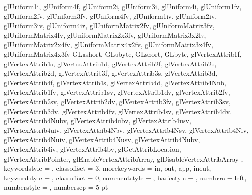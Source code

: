 {{{		glUniform1i, glUniform4f, glUniform2i, glUniform3i, glUniform4i,
		glUniform1fv, glUniform2fv, glUniform3fv, glUniform4fv,
		glUniform1iv, glUniform2iv, glUniform3iv, glUniform4iv,
		glUniformMatrix2fv, glUniformMatrix3fv, glUniformMatrix4fv, glUniformMatrix2x3fv, glUniformMatrix3x2fv, glUniformMatrix2x4fv, glUniformMatrix4x2fv, glUniformMatrix3x4fv, glUniformMatrix4x3fv
		GLushort, GLubyte, GLshort, GLbyte,
		glVertexAttrib1f, glVertexAttrib1s, glVertexAttrib1d,
		glVertexAttrib2f, glVertexAttrib2s, glVertexAttrib2d,
		glVertexAttrib3f, glVertexAttrib3s, glVertexAttrib3d,
		glVertexAttrib4f, glVertexAttrib4s, glVertexAttrib4d, glVertexAttrib4Nub,
		glVertexAttrib1fv, glVertexAttrib1sv, glVertexAttrib1dv,
		glVertexAttrib2fv, glVertexAttrib2sv, glVertexAttrib2dv,
		glVertexAttrib3fv, glVertexAttrib3sv, glVertexAttrib3dv,
		glVertexAttrib4fv, glVertexAttrib4sv, glVertexAttrib4dv, glVertexAttrib4Nubv,
		glVertexAttrib4ubv, glVertexAttrib4usv, glVertexAttrib4uiv, glVertexAttrib4Nbv, glVertexAttrib4Nsv, glVertexAttrib4Niv, glVertexAttrib4Nuiv, glVertexAttrib4Nusv, glVertexAttrib4Nubv,
		glVertexAttrib4iv, glVertexAttrib4bv, glGetAttribLocation, glVertexAttribPointer, glEnableVertexAttribArray, glDisableVertexAttribArray
		}, keywordstyle = {\color[rgb]{1.0, 0.0, 0.6}},
		classoffset = 3,
		morekeywords = {in, out, app, inout}, keywordstyle = {\color[rgb]{1.0, 0.0, 0.0}},
		classoffset = 0,
		commentstyle = {\color[rgb]{0.0, 0.5, 0.0}},
		basicstyle = \linespread{1}\scriptsize,
		numbers = left, numberstyle = \tiny, numbersep = 5 pt
	}
	
	\label{#3}
	\vspace{0.5\baselineskip}
	\noindent{}
	\begin{mdframed}[backgroundcolor = ListingBackgroundGray, linecolor = ListingBorderGray, linewidth = 0.25pt, skipabove = -0.5pt, skipbelow = 0.33\baselineskip, innertopmargin = 0pt, innerbottommargin = 0pt, innerleftmargin = 0pt, innerrightmargin = 0pt]
%	
%	
	
	\end{mdframed}
}

